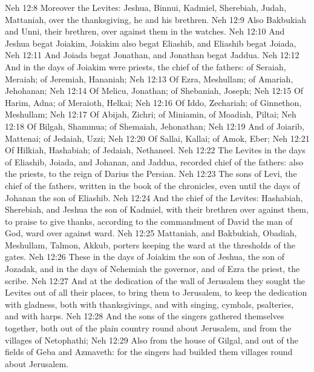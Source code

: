 \vs Neh 12:8 Moreover the Levites: Jeshua, Binnui, Kadmiel, Sherebiah, Judah,  Mattaniah,  over the thanksgiving, he and his brethren.
\vs Neh 12:9 Also Bakbukiah and Unni, their brethren,  over against them in the watches.
\vs Neh 12:10 And Jeshua begat Joiakim, Joiakim also begat Eliashib, and Eliashib begat Joiada,
\vs Neh 12:11 And Joiada begat Jonathan, and Jonathan begat Jaddua.
\vs Neh 12:12 And in the days of Joiakim were priests, the chief of the fathers: of Seraiah, Meraiah; of Jeremiah, Hananiah;
\vs Neh 12:13 Of Ezra, Meshullam; of Amariah, Jehohanan;
\vs Neh 12:14 Of Melicu, Jonathan; of Shebaniah, Joseph;
\vs Neh 12:15 Of Harim, Adna; of Meraioth, Helkai;
\vs Neh 12:16 Of Iddo, Zechariah; of Ginnethon, Meshullam;
\vs Neh 12:17 Of Abijah, Zichri; of Miniamin, of Moadiah, Piltai;
\vs Neh 12:18 Of Bilgah, Shammua; of Shemaiah, Jehonathan;
\vs Neh 12:19 And of Joiarib, Mattenai; of Jedaiah, Uzzi;
\vs Neh 12:20 Of Sallai, Kallai; of Amok, Eber;
\vs Neh 12:21 Of Hilkiah, Hashabiah; of Jedaiah, Nethaneel.
\vs Neh 12:22 The Levites in the days of Eliashib, Joiada, and Johanan, and Jaddua,  recorded chief of the fathers: also the priests, to the reign of Darius the Persian.
\vs Neh 12:23 The sons of Levi, the chief of the fathers,  written in the book of the chronicles, even until the days of Johanan the son of Eliashib.
\vs Neh 12:24 And the chief of the Levites: Hashabiah, Sherebiah, and Jeshua the son of Kadmiel, with their brethren over against them, to praise  to give thanks, according to the commandment of David the man of God, ward over against ward.
\vs Neh 12:25 Mattaniah, and Bakbukiah, Obadiah, Meshullam, Talmon, Akkub,  porters keeping the ward at the thresholds of the gates.
\vs Neh 12:26 These  in the days of Joiakim the son of Jeshua, the son of Jozadak, and in the days of Nehemiah the governor, and of Ezra the priest, the scribe.
\vs Neh 12:27 And at the dedication of the wall of Jerusalem they sought the Levites out of all their places, to bring them to Jerusalem, to keep the dedication with gladness, both with thanksgivings, and with singing,  cymbals, psalteries, and with harps.
\vs Neh 12:28 And the sons of the singers gathered themselves together, both out of the plain country round about Jerusalem, and from the villages of Netophathi;
\vs Neh 12:29 Also from the house of Gilgal, and out of the fields of Geba and Azmaveth: for the singers had builded them villages round about Jerusalem.
